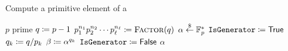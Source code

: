 \begin{algorithm}[t]
\caption{Compute a primitive element of a }
\label{alg:finite_field_generator}
\begin{algorithmic}[1]
\Require $p$ prime
    \State $q \coloneqq{} p-1$
    \State $p_{1}^{n_{1}}p_{2}^{n_{2}}\cdots p_{\ell}^{n_{\ell}}
        \coloneqq{} \textsc{Factor}(q)$
    \While{}
        \State $\alpha \stackrel{\$}{\leftarrow}{} \mathbb{F}_{p}^{*}$
        \State $\texttt{IsGenerator} \coloneqq{} \textsf{True}$
            \State $q_{k} \coloneqq{} q/p_{k}$
            \State $\beta \coloneqq{} \alpha^{q_{k}}$
                \State $\texttt{IsGenerator} \coloneqq{} \textsf{False}$
                \Break
            \EndIf
        \EndFor
            \Break
        \EndIf
    \EndWhile
    \State \Return $\alpha$
\EndProcedure
\end{algorithmic}
\end{algorithm}
